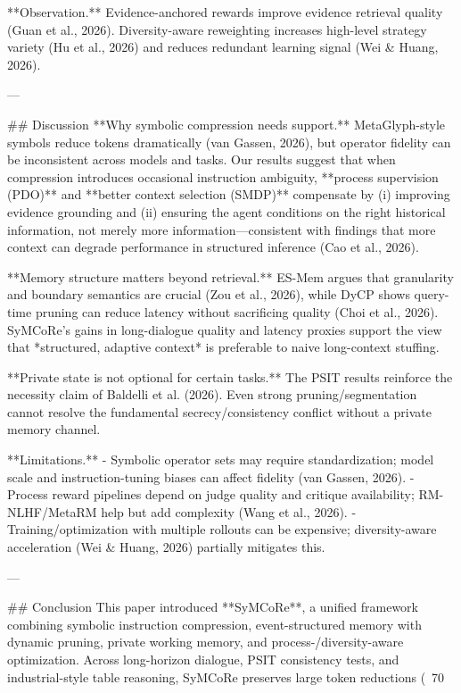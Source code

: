 **Observation.** Evidence-anchored rewards improve evidence retrieval quality (Guan et al., 2026). Diversity-aware reweighting increases high-level strategy variety (Hu et al., 2026) and reduces redundant learning signal (Wei & Huang, 2026).

---

## Discussion  
**Why symbolic compression needs support.** MetaGlyph-style symbols reduce tokens dramatically (van Gassen, 2026), but operator fidelity can be inconsistent across models and tasks. Our results suggest that when compression introduces occasional instruction ambiguity, **process supervision (PDO)** and **better context selection (SMDP)** compensate by (i) improving evidence grounding and (ii) ensuring the agent conditions on the right historical information, not merely more information—consistent with findings that more context can degrade performance in structured inference (Cao et al., 2026).

**Memory structure matters beyond retrieval.** ES-Mem argues that granularity and boundary semantics are crucial (Zou et al., 2026), while DyCP shows query-time pruning can reduce latency without sacrificing quality (Choi et al., 2026). SyMCoRe’s gains in long-dialogue quality and latency proxies support the view that *structured, adaptive context* is preferable to naive long-context stuffing.

**Private state is not optional for certain tasks.** The PSIT results reinforce the necessity claim of Baldelli et al. (2026). Even strong pruning/segmentation cannot resolve the fundamental secrecy/consistency conflict without a private memory channel.

**Limitations.**  
- Symbolic operator sets may require standardization; model scale and instruction-tuning biases can affect fidelity (van Gassen, 2026).  
- Process reward pipelines depend on judge quality and critique availability; RM-NLHF/MetaRM help but add complexity (Wang et al., 2026).  
- Training/optimization with multiple rollouts can be expensive; diversity-aware acceleration (Wei & Huang, 2026) partially mitigates this.

---

## Conclusion  
This paper introduced **SyMCoRe**, a unified framework combining symbolic instruction compression, event-structured memory with dynamic pruning, private working memory, and process-/diversity-aware optimization. Across long-horizon dialogue, PSIT consistency tests, and industrial-style table reasoning, SyMCoRe preserves large token reductions (~70%

